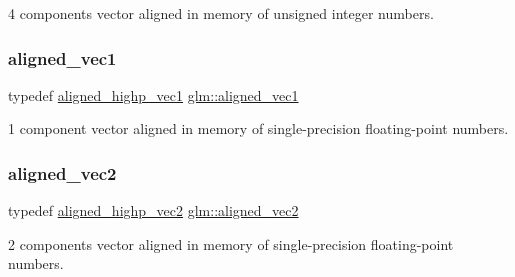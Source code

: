 4 components vector aligned in memory of unsigned integer numbers. 

\mbox{\label{group__gtc__type__aligned_ga8cf75c112dfa39264b7ef65c2ed6b3c4}} 
\subsubsection{\texorpdfstring{aligned\+\_\+vec1}{aligned\_vec1}}
{\footnotesize\ttfamily typedef \mbox{\hyperlink{group__gtc__type__aligned_ga8da7535c1fe488b2b9a29c0c05e7b17e}{aligned\+\_\+highp\+\_\+vec1}} \mbox{\hyperlink{group__gtc__type__aligned_ga8cf75c112dfa39264b7ef65c2ed6b3c4}{glm\+::aligned\+\_\+vec1}}}



1 component vector aligned in memory of single-\/precision floating-\/point numbers. 

\mbox{\label{group__gtc__type__aligned_ga8f4a38f220c72d218dbdc7bc1d06a1a2}} 
\subsubsection{\texorpdfstring{aligned\+\_\+vec2}{aligned\_vec2}}
{\footnotesize\ttfamily typedef \mbox{\hyperlink{group__gtc__type__aligned_ga7467c1a16f31911de3b927338434af6d}{aligned\+\_\+highp\+\_\+vec2}} \mbox{\hyperlink{group__gtc__type__aligned_ga8f4a38f220c72d218dbdc7bc1d06a1a2}{glm\+::aligned\+\_\+vec2}}}



2 components vector aligned in memory of single-\/precision floating-\/point numbers. 

\mbox{\label{group__gtc__type__aligned_ga9c54536a3becfd10a44f6b1b8c4aa3d3}} 
